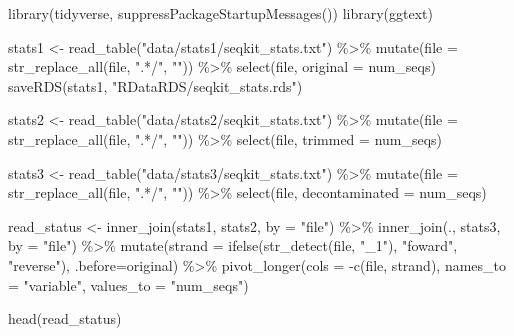 \documentclass[
  12pt,
  openany]{book}
\newenvironment{Shaded}{\begin{snugshade}}{\end{snugshade}}
\newcommand{\AttributeTok}[1]{\textcolor[rgb]{0.77,0.63,0.00}{#1}}
\newcommand{\FunctionTok}[1]{\textcolor[rgb]{0.00,0.00,0.00}{#1}}
\newcommand{\NormalTok}[1]{#1}
\newcommand{\OtherTok}[1]{\textcolor[rgb]{0.56,0.35,0.01}{#1}}
\newcommand{\SpecialCharTok}[1]{\textcolor[rgb]{0.00,0.00,0.00}{#1}}
\newcommand{\StringTok}[1]{\textcolor[rgb]{0.31,0.60,0.02}{#1}}
\begin{document}
\begin{Shaded}
\begin{Highlighting}[]
\FunctionTok{library}\NormalTok{(tidyverse, }\FunctionTok{suppressPackageStartupMessages}\NormalTok{())}
\FunctionTok{library}\NormalTok{(ggtext)}

\NormalTok{stats1 }\OtherTok{\textless{}{-}} \FunctionTok{read\_table}\NormalTok{(}\StringTok{"data/stats1/seqkit\_stats.txt"}\NormalTok{) }\SpecialCharTok{\%\textgreater{}\%} 
  \FunctionTok{mutate}\NormalTok{(}\AttributeTok{file =} \FunctionTok{str\_replace\_all}\NormalTok{(file, }\StringTok{".*/"}\NormalTok{, }\StringTok{""}\NormalTok{)) }\SpecialCharTok{\%\textgreater{}\%} 
  \FunctionTok{select}\NormalTok{(file, }\AttributeTok{original =}\NormalTok{ num\_seqs)}
\FunctionTok{saveRDS}\NormalTok{(stats1, }\StringTok{"RDataRDS/seqkit\_stats.rds"}\NormalTok{)}

\NormalTok{stats2 }\OtherTok{\textless{}{-}} \FunctionTok{read\_table}\NormalTok{(}\StringTok{"data/stats2/seqkit\_stats.txt"}\NormalTok{) }\SpecialCharTok{\%\textgreater{}\%} 
  \FunctionTok{mutate}\NormalTok{(}\AttributeTok{file =} \FunctionTok{str\_replace\_all}\NormalTok{(file, }\StringTok{".*/"}\NormalTok{, }\StringTok{""}\NormalTok{)) }\SpecialCharTok{\%\textgreater{}\%} 
  \FunctionTok{select}\NormalTok{(file, }\AttributeTok{trimmed =}\NormalTok{ num\_seqs)}

\NormalTok{stats3 }\OtherTok{\textless{}{-}} \FunctionTok{read\_table}\NormalTok{(}\StringTok{"data/stats3/seqkit\_stats.txt"}\NormalTok{) }\SpecialCharTok{\%\textgreater{}\%} 
  \FunctionTok{mutate}\NormalTok{(}\AttributeTok{file =} \FunctionTok{str\_replace\_all}\NormalTok{(file, }\StringTok{".*/"}\NormalTok{, }\StringTok{""}\NormalTok{)) }\SpecialCharTok{\%\textgreater{}\%} 
  \FunctionTok{select}\NormalTok{(file, }\AttributeTok{decontaminated =}\NormalTok{ num\_seqs)}

\NormalTok{read\_status }\OtherTok{\textless{}{-}} \FunctionTok{inner\_join}\NormalTok{(stats1, stats2, }\AttributeTok{by =} \StringTok{"file"}\NormalTok{) }\SpecialCharTok{\%\textgreater{}\%} 
  \FunctionTok{inner\_join}\NormalTok{(., stats3, }\AttributeTok{by =} \StringTok{"file"}\NormalTok{) }\SpecialCharTok{\%\textgreater{}\%} 
  \FunctionTok{mutate}\NormalTok{(}\AttributeTok{strand =} \FunctionTok{ifelse}\NormalTok{(}\FunctionTok{str\_detect}\NormalTok{(file, }\StringTok{"\_1"}\NormalTok{), }\StringTok{"foward"}\NormalTok{, }\StringTok{"reverse"}\NormalTok{), }\AttributeTok{.before=}\NormalTok{original) }\SpecialCharTok{\%\textgreater{}\%}
  \FunctionTok{pivot\_longer}\NormalTok{(}\AttributeTok{cols =} \SpecialCharTok{{-}}\FunctionTok{c}\NormalTok{(file, strand), }\AttributeTok{names\_to =} \StringTok{"variable"}\NormalTok{, }\AttributeTok{values\_to =} \StringTok{"num\_seqs"}\NormalTok{)}

\FunctionTok{head}\NormalTok{(read\_status)}
\end{Highlighting}
\end{Shaded}
\end{document}
